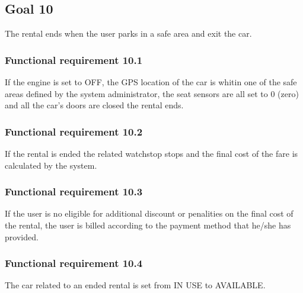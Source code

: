 \subsection{Goal 10}
The rental ends when the user parks in a safe area and exit the car.

\setcounter{secnumdepth}{3}
\subsubsection{Functional requirement 10.1}
If the engine is set to OFF, the GPS location of the car is whitin one of the safe areas defined by the system administrator, the seat sensors are all set to 0 (zero) and all the car's doors are closed the rental ends.

\subsubsection{Functional requirement 10.2}
If the rental is ended the related watchstop stops and the final cost of the fare is calculated by the system.

\subsubsection{Functional requirement 10.3}
If the user is no eligible for additional discount or penalities on the final cost of the rental, the user is billed according to the payment method that he/she has provided.

\subsubsection{Functional requirement 10.4}
The car related to an ended rental is set from IN USE to AVAILABLE.
